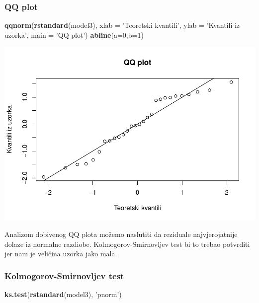 \documentclass[]{article}
\newenvironment{Shaded}{\begin{snugshade}}{\end{snugshade}}
\newcommand{\KeywordTok}[1]{\textcolor[rgb]{0.13,0.29,0.53}{\textbf{{#1}}}}
\newcommand{\DataTypeTok}[1]{\textcolor[rgb]{0.13,0.29,0.53}{{#1}}}
\newcommand{\DecValTok}[1]{\textcolor[rgb]{0.00,0.00,0.81}{{#1}}}
\newcommand{\StringTok}[1]{\textcolor[rgb]{0.31,0.60,0.02}{{#1}}}
\newcommand{\NormalTok}[1]{{#1}}
\begin{document}
\subsubsection{QQ plot}\label{qq-plot-3}

\begin{Shaded}
\begin{Highlighting}[]
\KeywordTok{qqnorm}\NormalTok{(}\KeywordTok{rstandard}\NormalTok{(model3), }\DataTypeTok{xlab =} \StringTok{'Teoretski kvantili'}\NormalTok{, }\DataTypeTok{ylab =} \StringTok{'Kvantili iz uzorka'}\NormalTok{,}
       \DataTypeTok{main =} \StringTok{'QQ plot'}\NormalTok{)}
\KeywordTok{abline}\NormalTok{(}\DataTypeTok{a=}\DecValTok{0}\NormalTok{,}\DataTypeTok{b=}\DecValTok{1}\NormalTok{)}
\end{Highlighting}
\end{Shaded}

\includegraphics{Izvjestaj_files/figure-latex/unnamed-chunk-38-1.pdf}

Analizom dobivenog QQ plota možemo naslutiti da reziduale
najvjerojatnije dolaze iz normalne razdiobe. Kolmogorov-Smirnovljev test
bi to trebao potvrditi jer nam je veličina uzorka jako mala.

\subsubsection{Kolmogorov-Smirnovljev
test}\label{kolmogorov-smirnovljev-test-3}

\begin{Shaded}
\begin{Highlighting}[]
\KeywordTok{ks.test}\NormalTok{(}\KeywordTok{rstandard}\NormalTok{(model3), }\StringTok{'pnorm'}\NormalTok{)}
\end{Highlighting}
\end{Shaded}
\end{document}
